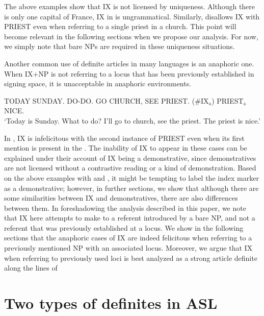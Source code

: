 \documentclass[output=paper,
modfonts
]{langscibook}
\begin{document}
The above examples show that IX is not licensed by uniqueness. Although there is only one capital of France, IX in  is ungrammatical. Similarly,  disallows IX with PRIEST even when referring to a single priest in a church. This point will become relevant in the following sections when we propose our analysis. For now, we simply note that bare NPs are required in these uniqueness situations. 

Another common use of definite articles in many languages is an anaphoric one. When IX+NP is not referring to a locus that has been previously established in signing space, it is unacceptable in anaphoric environments. 

\begin{exe} 
\ex \label{ex:irani:6} TODAY SUNDAY. DO-DO. GO CHURCH, SEE PRIEST. (\#IX$_\text{a}$) PRIEST$_\text{a}$ NICE. \\
`Today is Sunday. What to do? I’ll go to church, see the priest. The priest is nice.’ \citep[12]{KoulidobrovaLilloMartin2016}
\end{exe}

In , IX is infelicitous with the second instance of PRIEST even when its first mention is present in the . The inability of IX to appear in these cases can be explained under their account of IX being a demonstrative, since demonstratives are not licensed without a contrastive reading or a kind of demonstration. Based on the above examples with  and , it might be tempting to label the index marker as a demonstrative; however, in further sections, we show that although there are some similarities between IX and demonstratives, there are also differences between them. In foreshadowing the analysis described in this paper, we note that IX here attempts to make  to a referent introduced by a bare NP, and not a referent that was previously established at a locus. We show in the following sections that the anaphoric cases of IX are indeed felicitous when referring to a previously mentioned NP with an associated locus. Moreover, we argue that IX when referring to previously used loci is best analyzed as a strong article definite along the lines of \citet{Schwarz2009,Schwarz2013}

\section{Two types of definites in ASL}\label{sec:irani:3} 
\end{document}
